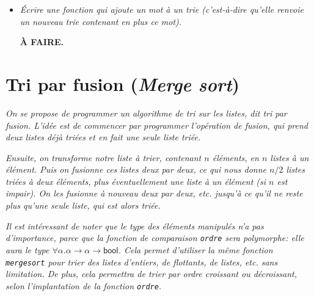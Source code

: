 \documentclass[11pt, a4paper]{article}
\begin{document}
\begin{itemize}
       \medskip

       \textbf{À FAIRE.}

  \item[\textbf{A.7}] \emph{Écrire une fonction qui ajoute un mot à un
       \emph{trie} (c'est-à-dire qu'elle renvoie un nouveau
       \emph{trie} contenant en plus ce mot).}

       \medskip

       \textbf{À FAIRE.}

\end{itemize}


\section{Tri par fusion (\emph{Merge sort})}

\emph{On se propose de programmer un algorithme de tri sur les listes,
dit \emph{tri par fusion}. L'idée est de commencer par programmer
l'opération de fusion, qui prend deux listes déjà triées et en fait
une seule liste triée.}

\emph{Ensuite, on transforme notre liste à trier, contenant $n$
éléments, en $n$ listes à un élément. Puis on fusionne ces listes deux
par deux, ce qui nous donne $n/2$ listes triées à deux éléments, plus
éventuellement une liste à un élément (si $n$ est impair). On les
fusionne à nouveau deux par deux, etc. jusqu'à ce qu'il ne reste plus
qu'une seule liste, qui est alors triée.}

\emph{Il est intéressant de noter que le type des éléments manipulés
n'a pas d'importance, parce que la fonction de comparaison
\texttt{ordre} sera polymorphe: elle aura le type
$\forall\alpha.\alpha\rightarrow\alpha\rightarrow\textsf{bool}$.  Cela
permet d'utiliser la même fonction \texttt{mergesort} pour trier des
listes d'entiers, de flottants, de listes, etc. sans limitation. De
plus, cela permettra de trier par ordre croissant ou décroissant,
selon l'implantation de la fonction \texttt{ordre}.}
\end{document}
